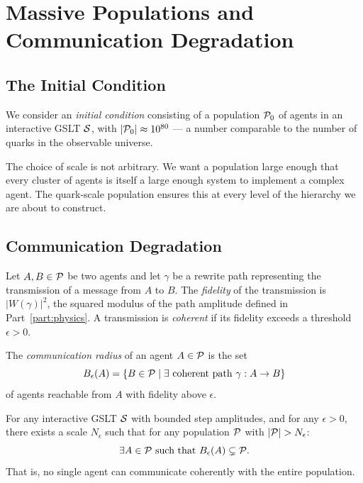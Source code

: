 \chapter{Massive Populations and Communication Degradation}
\label{sec:population}

\section{The Initial Condition}

We consider an \emph{initial condition} consisting of a population
$\mathcal{P}_0$ of agents in an interactive GSLT $\mathcal{S}$, with
$|\mathcal{P}_0| \approx 10^{80}$ --- a number comparable to the number of
quarks in the observable universe.

\begin{remark}
The choice of scale is not arbitrary.
We want a population large enough that every cluster of agents is
itself a large enough system to implement a complex agent.
The quark-scale population ensures this at every level of the
hierarchy we are about to construct.
\end{remark}

\section{Communication Degradation}

\begin{definition}
Let $A, B \in \mathcal{P}$ be two agents and let $\gamma$ be a rewrite
path representing the transmission of a message from $A$ to $B$.
The \emph{fidelity} of the transmission is $|W(\gamma)|^2$, the
squared modulus of the path amplitude defined in Part~\ref{part:physics}.
A transmission is \emph{coherent} if its fidelity exceeds a threshold
$\epsilon > 0$.
\end{definition}

\begin{definition}
The \emph{communication radius} of an agent $A \in \mathcal{P}$ is the set
\[
  B_\epsilon(A) = \{ B \in \mathcal{P} \mid
  \exists \text{ coherent path } \gamma : A \to B \}
\]
of agents reachable from $A$ with fidelity above $\epsilon$.
\end{definition}

\begin{conjecture}
\label{conj:degradation}
For any interactive GSLT $\mathcal{S}$ with bounded step amplitudes,
and for any $\epsilon > 0$, there exists a scale $N_\epsilon$ such
that for any population $\mathcal{P}$ with $|\mathcal{P}| > N_\epsilon$:
\[
  \exists A \in \mathcal{P} \text{ such that }
  B_\epsilon(A) \subsetneq \mathcal{P}.
\]
That is, no single agent can communicate coherently with the entire
population.
\end{conjecture}

